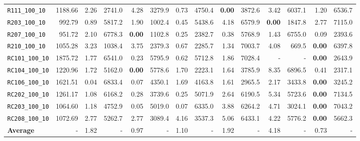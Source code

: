 \begin{table}[ht]
\begin{adjustbox}{width=\textwidth}
\begin{tabular}{l r r r @{\hspace{8pt}} r r @{\hspace{8pt}} r r @{\hspace{8pt}} r r @{\hspace{8pt}} r r @{\hspace{8pt}} r r @{\hspace{8pt}}}
\texttt{R111\_100\_10} & 1188.66 & 2.26 & 2741.0 & 4.28 & 3279.9 & 0.73 & 4750.4 & \textbf{0.00} & 3872.6 & 3.42 & 6037.1 & 1.20 & 6536.7 \\
\texttt{R203\_100\_10} & 992.79 & 0.89 & 5817.2 & 1.90 & 1002.4 & 0.45 & 5438.6 & 4.18 & 6579.9 & \textbf{0.00} & 1847.8 & 2.77 & 7115.0 \\
\texttt{R207\_100\_10} & 951.72 & 2.10 & 6778.3 & \textbf{0.00} & 1102.8 & 0.25 & 2382.7 & 0.38 & 5768.9 & 1.43 & 6755.0 & 0.09 & 2393.6 \\
\texttt{R210\_100\_10} & 1055.28 & 3.23 & 1038.4 & 3.75 & 2379.3 & 0.67 & 2285.7 & 1.34 & 7003.7 & 4.08 & 669.5 & \textbf{0.00} & 6397.8 \\
\texttt{RC101\_100\_10} & 1875.72 & 1.77 & 6541.0 & 0.23 & 5795.9 & 0.62 & 5712.8 & 1.86 & 7028.4 & - & - & \textbf{0.00} & 2643.9 \\
\texttt{RC104\_100\_10} & 1220.96 & 1.72 & 5162.0 & \textbf{0.00} & 5778.6 & 1.70 & 2223.1 & 1.64 & 3785.9 & 8.35 & 6896.5 & 0.41 & 2317.1 \\
\texttt{RC106\_100\_10} & 1621.51 & 0.04 & 6833.4 & 0.07 & 4350.1 & 1.69 & 4163.8 & 1.61 & 2965.5 & 2.17 & 3433.8 & \textbf{0.00} & 3245.2 \\
\texttt{RC202\_100\_10} & 1261.17 & 1.08 & 6168.2 & 0.28 & 3739.6 & 0.25 & 5071.9 & 2.64 & 6190.5 & 5.34 & 5723.6 & \textbf{0.00} & 7134.5 \\
\texttt{RC203\_100\_10} & 1064.60 & 1.18 & 4752.9 & 0.05 & 5019.0 & 0.07 & 6335.0 & 3.88 & 6264.2 & 4.71 & 3024.1 & \textbf{0.00} & 7043.2 \\
\texttt{RC208\_100\_10} & 1072.69 & 2.77 & 5262.7 & 2.77 & 3089.4 & 4.16 & 3537.3 & 5.06 & 6433.1 & 4.22 & 5776.2 & \textbf{0.00} & 5662.3 \\
\midrule
\textbf{Average} & - & 1.82 & - & 0.97 & - & 1.10 & - & 1.92 & - & 4.18 & - & 0.73 & - \\
\bottomrule
\end{tabular}
\end{adjustbox}
\end{table}